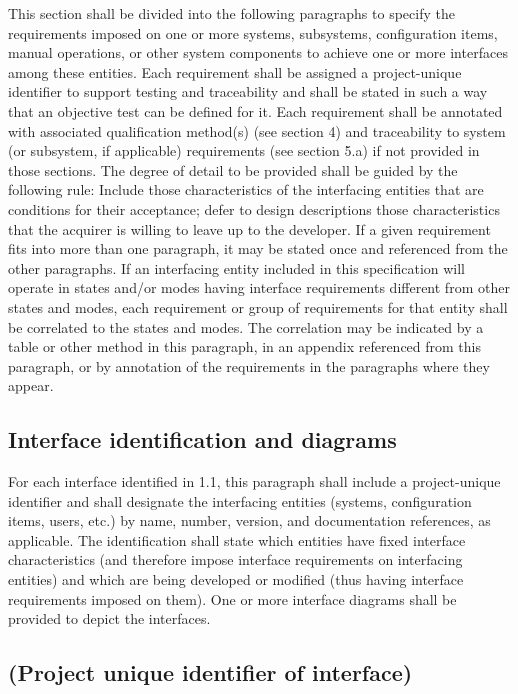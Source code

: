 This section shall be divided into the following paragraphs to specify
the requirements imposed on one or more systems, subsystems,
configuration items, manual operations, or other system components to
achieve one or more interfaces among these entities. Each requirement
shall be assigned a project-unique identifier to support testing and
traceability and shall be stated in such a way that an objective test
can be defined for it. Each requirement shall be annotated with
associated qualification method(s) (see section 4) and traceability to
system (or subsystem, if applicable) requirements (see section 5.a) if
not provided in those sections. The degree of detail to be provided
shall be guided by the following rule: Include those characteristics of
the interfacing entities that are conditions for their acceptance; defer
to design descriptions those characteristics that the acquirer is
willing to leave up to the developer. If a given requirement fits into
more than one paragraph, it may be stated once and referenced from the
other paragraphs. If an interfacing entity included in this
specification will operate in states and/or modes having interface
requirements different from other states and modes, each requirement or
group of requirements for that entity shall be correlated to the states
and modes. The correlation may be indicated by a table or other method
in this paragraph, in an appendix referenced from this paragraph, or by
annotation of the requirements in the paragraphs where they appear.

\subsection{Interface identification and diagrams}

For each interface identified in 1.1, this paragraph shall include a
project-unique identifier and shall designate the interfacing entities
(systems, configuration items, users, etc.) by name, number, version,
and documentation references, as applicable. The identification shall
state which entities have fixed interface characteristics (and therefore
impose interface requirements on interfacing entities) and which are
being developed or modified (thus having interface requirements imposed
on them). One or more interface diagrams shall be provided to depict the
interfaces.

\subsection{(Project unique identifier of interface)}

